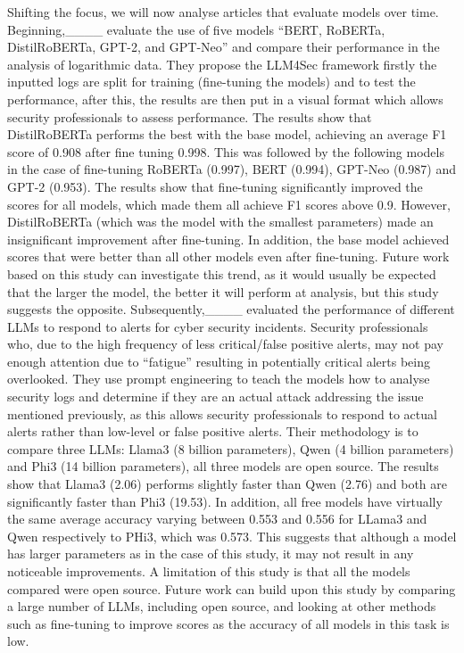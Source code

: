 Shifting the focus, we will now analyse articles that evaluate models over time. Beginning,____ evaluate the use of five models ``BERT, RoBERTa, DistilRoBERTa, GPT-2, and GPT-Neo'' and compare their performance in the analysis of logarithmic data. They propose the LLM4Sec framework firstly the inputted logs are split for training (fine-tuning the models) and to test the performance, after this, the results are then put in a visual format which allows security professionals to assess performance. The results show that DistilRoBERTa performs the best with the base model, achieving an average F1 score of 0.908 after fine tuning 0.998. This was followed by the following models in the case of fine-tuning RoBERTa (0.997), BERT (0.994), GPT-Neo (0.987) and GPT-2 (0.953). The results show that fine-tuning significantly improved the scores for all models, which made them all achieve F1 scores above 0.9. However, DistilRoBERTa (which was the model with the smallest parameters) made an insignificant improvement after fine-tuning. In addition, the base model achieved scores that were better than all other models even after fine-tuning. Future work based on this study can investigate this trend, as it would usually be expected that the larger the model, the better it will perform at analysis, but this study suggests the opposite. Subsequently,____ evaluated the performance of different LLMs to respond to alerts for cyber security incidents. Security professionals who, due to the high frequency of less critical/false positive alerts, may not pay enough attention due to ``fatigue'' resulting in potentially critical alerts being overlooked. They use prompt engineering to teach the models how to analyse security logs and determine if they are an actual attack addressing the issue mentioned previously, as this allows security professionals to respond to actual alerts rather than low-level or false positive alerts. Their methodology is to compare three LLMs: Llama3 (8 billion parameters), Qwen (4 billion parameters) and Phi3 (14 billion parameters), all three models are open source. The results show that Llama3 (2.06) performs slightly faster than Qwen (2.76) and both are significantly faster than Phi3 (19.53). In addition, all free models have virtually the same average accuracy varying between 0.553 and 0.556 for LLama3 and Qwen respectively to PHi3, which was 0.573. This suggests that although a model has larger parameters as in the case of this study, it may not result in any noticeable improvements. A limitation of this study is that all the models compared were open source. Future work can build upon this study by comparing a large number of LLMs, including open source, and looking at other methods such as fine-tuning to improve scores as the accuracy of all models in this task is low. 

